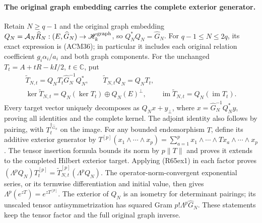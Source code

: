 \paragraph{The original graph embedding carries the complete exterior generator.}
Retain $N\geq q-1$ and the original graph embedding
$Q_N=\mathcal A_N\widehat R_N:(E,\widehat G_N)\to
\mathscr H_k^{\rm graph}$, so $Q_N^*Q_N=\widehat G_N$.
For $q-1\leq N\leq2q$, its exact expression is (ACM36);
in particular it includes each original relation coefficient
$g_i\alpha_i/a_i$ and both graph components. For the unchanged
$T_t=A+tR-kI/2$, $t\in\mathbb C$, put
\[
\begin{gathered}
 \widetilde T_{N,t}
       =Q_NT_t\widehat G_N^{-1}Q_N^*,\qquad
 \widetilde T_{N,t}Q_N=Q_NT_t,\\
 \ker\widetilde T_{N,t}
       =Q_N(\ker T_t)\oplus Q_N(E)^\perp,\qquad
 \operatorname{im}\widetilde T_{N,t}=Q_N(\operatorname{im}T_t).
\end{gathered}\tag{R65ex1}
\]
Every target vector uniquely decomposes as $Q_Nx+y_\perp$,
where $x=\widehat G_N^{-1}Q_N^*y$, proving all identities and
the complete kernel. The adjoint identity also follows by
pairing, with $T_t^{\dagger_{\widehat G_N}}$ on the image.
For any bounded endomorphism $T$, define its additive exterior
generator by
$T^{[p]}(x_1\wedge\cdots\wedge x_p)=
\sum_{a=1}^p x_1\wedge\cdots\wedge Tx_a\wedge\cdots\wedge x_p$.
The tensor insertion formula bounds its norm by $p\|T\|$ and
proves it extends to the completed Hilbert exterior target.
Applying (R65ex1) in each factor proves
$(\Lambda^pQ_N)T_t^{[p]}
=\widetilde T_{N,t}^{[p]}(\Lambda^pQ_N)$.
The operator-norm-convergent exponential series, or its termwise
differentiation and initial value, then gives
$\Lambda^p(e^{zT})=e^{zT^{[p]}}$.
The exterior of $Q_N$ is an isometry for determinant pairings;
its unscaled tensor antisymmetrization has squared Gram
$p!\Lambda^p\widehat G_N$. These statements keep the tensor
factor and the full original graph inverse.

